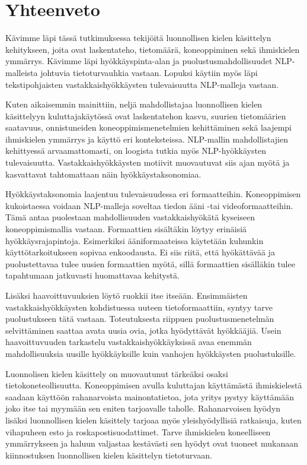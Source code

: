 \chapter{Yhteenveto\label{conclusions}}

Kävimme läpi tässä tutkimuksessa tekijöitä luonnollisen kielen käsittelyn kehitykseen, joita ovat laskentateho, tietomäärä, koneoppiminen sekä ihmiskielen ymmärrys. Kävimme läpi hyökkäyspinta-alan ja puolustusmahdollisuudet NLP-malleista johtuvia tietoturvauhkia vastaan. Lopuksi käytiin myös läpi tekstipohjaisten vastakkaishyökkäysten tulevaisuutta NLP-malleja vastaan.

Kuten aikaisemmin mainittiin, neljä mahdollistajaa luonnollisen kielen käsittelyyn kuluttajakäytössä ovat laskentatehon kasvu, suurien tietomäärien saatavuus, onnistuneiden koneoppimismenetelmien kehittäminen sekä laajempi ihmiskielen ymmärrys ja käyttö eri konteksteissa. NLP-mallin mahdollistajien kehittyessä arvaamattomasti, on loogista tutkia myös NLP-hyökkäysten tulevaisuutta. Vastakkaishyökkäysten motiivit muovautuvat siis ajan myötä ja kasvattavat tahtomattaan näin hyökkäystaksonomiaa. 

Hyökkäystaksonomia laajentuu tulevaisuudessa eri formaatteihin. Koneoppimisen kukoistaessa voidaan NLP-malleja soveltaa tiedon ääni -tai videoformaatteihin. Tämä antaa puolestaan mahdollisuuden vastakkaishyökätä kyseiseen koneoppimismallia vastaan. Formaattien sisältäkin löytyy erinäisiä hyökkäysrajapintoja. Esimerkiksi ääniformaateissa käytetään kuhunkin käyttötarkoitukseen sopivaa enkoodausta. Ei siis riitä, että hyökättävää ja puolustettavaa tulee uusien formaattien myötä, sillä formaattien sisälläkin tulee tapahtumaan jatkuvasti huomattavaa kehitystä.

Lisäksi haavoittuvuuksien löytö ruokkii itse itseään. Ensimmäisten vastakkaishyökkäysten kohdistuessa uuteen tietoformaattiin, syntyy tarve puolustukseen tätä vastaan. Toteutuksesta riippuen puolustusmenetelmän selvittäminen saattaa avata uusia ovia, jotka hyödyttävät hyökkääjiä. Usein haavoittuvuuden tarkastelu vastakkaishyökkäyksissä avaa enemmän mahdollisuuksia uusille hyökkäyksille kuin vanhojen hyökkäysten puolustuksille.

Luonnolisen kielen käsittely on muovautunut tärkeäksi osaksi tietokoneteollisuutta. Koneoppimisen avulla kuluttajan käyttämästä ihmiskielestä saadaan käyttöön rahanarvoista mainontatietoa, jota yritys pystyy käyttämään joko itse tai myymään sen eniten tarjoavalle taholle. Rahanarvoisen hyödyn lisäksi luonnollisen kielen käsittely tarjoaa myös yleishyödyllisiä ratkaisuja, kuten vihapuheen esto ja roskapostisuodattimet. Tarve ihmiskielen koneelliseen ymmärrykseen ja haluun valjastaa kestävästi sen hyödyt ovat tuoneet mukanaan kiinnostuksen luonnollisen kielen käsittelyn tietoturvaan.
